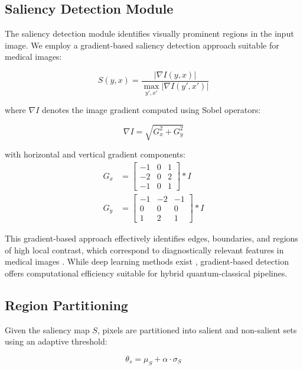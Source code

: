 \documentclass{ipol}
\begin{document}
\subsection{Saliency Detection Module}

The saliency detection module identifies visually prominent regions in the input image. We employ a gradient-based saliency detection approach suitable for medical images:

\begin{equation}
S(y, x) = \frac{|\nabla I(y, x)|}{\max_{y',x'} |\nabla I(y', x')|}
\label{eq:saliency_computation}
\end{equation}

where $\nabla I$ denotes the image gradient computed using Sobel operators:

\begin{equation}
\nabla I = \sqrt{G_x^2 + G_y^2}
\label{eq:gradient}
\end{equation}

with horizontal and vertical gradient components:
\begin{align}
G_x &= \begin{bmatrix} -1 & 0 & 1 \\ -2 & 0 & 2 \\ -1 & 0 & 1 \end{bmatrix} * I \\
G_y &= \begin{bmatrix} -1 & -2 & -1 \\ 0 & 0 & 0 \\ 1 & 2 & 1 \end{bmatrix} * I
\end{align}

This gradient-based approach effectively identifies edges, boundaries, and regions of high local contrast, which correspond to diagnostically relevant features in medical images \cite{bib65,bib66,bib67}. While deep learning methods exist \cite{bib56,bib57}, gradient-based detection offers computational efficiency suitable for hybrid quantum-classical pipelines.

\subsection{Region Partitioning}

Given the saliency map $S$, pixels are partitioned into salient and non-salient sets using an adaptive threshold:

\begin{equation}
\theta_s = \mu_S + \alpha \cdot \sigma_S
\label{eq:threshold}
\end{equation}
\end{document}
